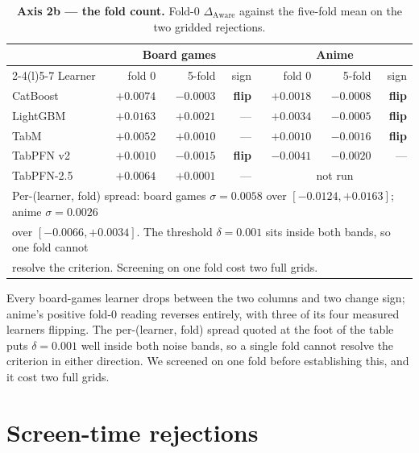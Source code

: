 \documentclass[10pt,letterpaper]{article}
\newcommand{\da}{\Delta_{\mathrm{Aware}}}
\begin{document}
\begin{table}[H]
\centering\small
\caption{\textbf{Axis 2b --- the fold count.} Fold-0 $\da$ against the five-fold mean on the
two gridded rejections.}
\begin{tabular}{lrrr@{\hskip 22pt}rrr}
\toprule
& \multicolumn{3}{c}{Board games} & \multicolumn{3}{c}{Anime} \\
\cmidrule(r){2-4}\cmidrule(l){5-7}
Learner & fold 0 & 5-fold & sign & fold 0 & 5-fold & sign \\
\midrule
CatBoost   & $+0.0074$ & $-0.0003$ & \textbf{flip} & $+0.0018$ & $-0.0008$ & \textbf{flip} \\
LightGBM   & $+0.0163$ & $+0.0021$ & --- & $+0.0034$ & $-0.0005$ & \textbf{flip} \\
TabM       & $+0.0052$ & $+0.0010$ & --- & $+0.0010$ & $-0.0016$ & \textbf{flip} \\
TabPFN v2  & $+0.0010$ & $-0.0015$ & \textbf{flip} & $-0.0041$ & $-0.0020$ & --- \\
TabPFN-2.5 & $+0.0064$ & $+0.0001$ & --- & \multicolumn{3}{c}{not run} \\
\midrule
\multicolumn{7}{l}{Per-(learner, fold) spread: board games $\sigma = 0.0058$ over $[-0.0124, +0.0163]$; anime $\sigma = 0.0026$} \\
\multicolumn{7}{l}{over $[-0.0066, +0.0034]$. The threshold $\delta = 0.001$ sits inside both bands, so one fold cannot} \\
\multicolumn{7}{l}{resolve the criterion. Screening on one fold cost two full grids.} \\
\bottomrule
\end{tabular}
\end{table}

\noindent Every board-games learner drops between the two columns and two change sign; anime's positive
fold-0 reading reverses entirely, with three of its four measured learners flipping. The
per-(learner, fold) spread quoted at the foot of the table puts $\delta = 0.001$ well inside
both noise bands, so a single fold cannot resolve the criterion in either direction. We
screened on one fold before establishing this, and it cost two full grids.


\clearpage
\section{Screen-time rejections}
\label{app:screen}
\end{document}
